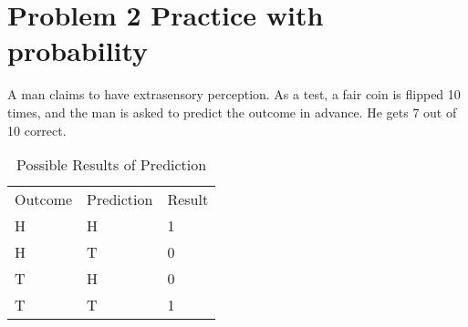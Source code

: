 \documentclass[preprint,12pt]{elsarticle}
\begin{document}
    \section{Problem 2 Practice with probability}
    A man claims to have extrasensory perception. As a test, a fair coin is flipped 10 times, and the man is
    asked to predict the outcome in advance. He gets 7 out of 10 correct.
    \begin{table}[]
        \centering
        \caption{Possible Results of Prediction}
        \label{my-label}
        \begin{tabular}{lll}
        Outcome & Prediction & Result \\
        H       & H          & 1  \\
        H       & T          & 0   \\
        T       & H          & 0   \\
        T       & T          & 1    \\
        \end{tabular}
    \end{table}
\end{document}
